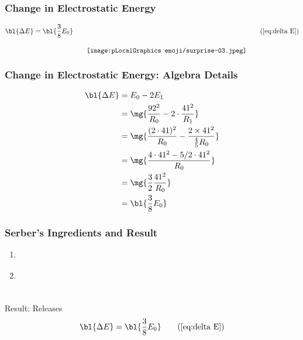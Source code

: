 \begin{frame}\frametitle{Change in Electrostatic Energy}
\begin{equation}
	\bl{\Delta E} = \bl{\frac{3}{8}E_{0}} \qquad \raisebox{-1cm}{\texttt{[image: \\pLocalGraphics emoji/surprise-03.jpeg]}}
\tag{\ref{eq:delta E}}
\end{equation}
\end{frame}

\begin{frame}\frametitle{Change in Electrostatic Energy: Algebra Details}
\begin{equation}
	\begin{split}
		\bl{\Delta E} &= E_{0} - 2E_{1} \\
			&= \mg{\frac{92^{2}}{R_{0}} - 2 \cdot \frac{41^{2}}{R_{1}}} \\
			&= \mg{\frac{(2\cdot 41)^{2}}{R_{0}} - \frac{2 \times 41^{2}}{\tfrac{4}{5}R_{0}}} \\
			&= \mg{\frac{4\cdot 41^{2} - 5/2 \cdot 41^{2} }{R_{0}}} \\
			&= \mg{\frac{3}{2} \frac{41^{2}}{R_{0}}} \\
			&= \bl{\frac{3}{8}E_{0}}
	\end{split}
\end{equation}
\end{frame}
%
\begin{frame}\frametitle{Serber's Ingredients and Result\jumpLittle}
\begin{enumerate}
	\item \href{https://en.wikipedia.org/wiki/Sphere}{}
	\item \href{https://www.cliffsnotes.com/study-guides/physics/electricity-and-magnetism/electrostatics}{}
\end{enumerate}
\ \\[10pt]
\center
Result:  Releases  
\begin{equation}
	\bl{\Delta E} = \bl{\frac{3}{8}E_{0}} 
\tag{\ref{eq:delta E}}
\end{equation}
\end{frame}
%



